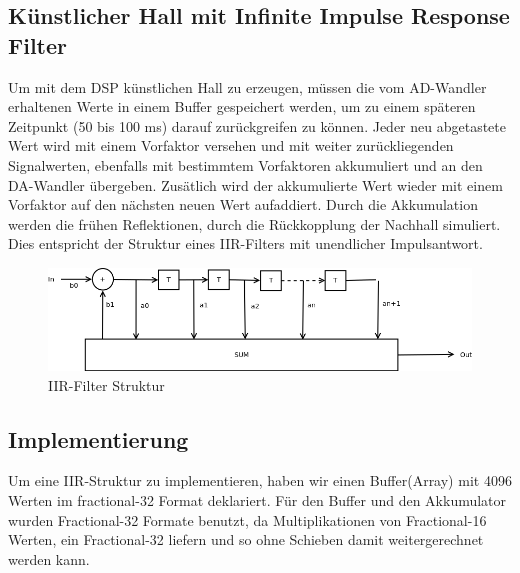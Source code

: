 \documentclass[a4paper,12pt,fontsize=12,DIV=12]{scrartcl}
\begin{document}
\subsection{Künstlicher Hall mit Infinite Impulse Response Filter}
Um mit dem DSP künstlichen Hall zu erzeugen, müssen die vom AD-Wandler erhaltenen Werte in einem Buffer gespeichert werden, um zu einem späteren Zeitpunkt (50 bis 100 ms) darauf zurückgreifen zu können. Jeder neu abgetastete Wert wird mit einem Vorfaktor versehen und mit weiter zurückliegenden Signalwerten, ebenfalls mit bestimmtem Vorfaktoren akkumuliert und an den DA-Wandler übergeben. Zusätlich wird der akkumulierte Wert wieder mit einem Vorfaktor auf den nächsten neuen Wert aufaddiert. Durch die Akkumulation werden die frühen Reflektionen, durch die Rückkopplung der Nachhall simuliert. 
Dies entspricht der Struktur eines IIR-Filters mit unendlicher Impulsantwort.
\begin{figure}[h]
	\includegraphics[scale=0.5]{Bilder/iir.png}
	\caption{IIR-Filter Struktur}
	\label{labelnameIIR-Filter Struktur}
\end{figure}

\subsection{Implementierung}
Um eine IIR-Struktur zu implementieren, haben wir einen Buffer(Array) mit 4096 Werten im fractional-32 Format deklariert. Für den Buffer und den Akkumulator wurden Fractional-32 Formate benutzt, da Multiplikationen von Fractional-16 Werten, ein Fractional-32 liefern und so ohne Schieben damit weitergerechnet werden kann.
\end{document}
